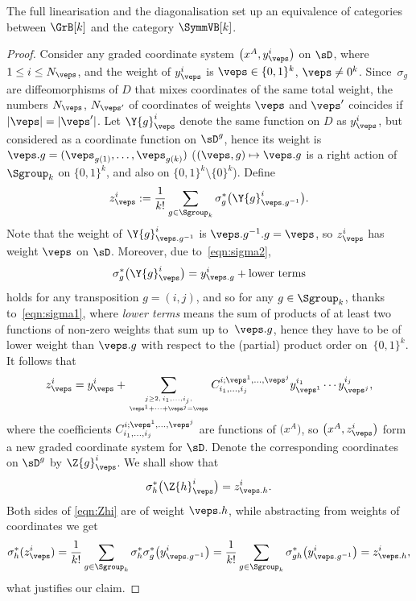 \begin{Theorem} \label{thm:equivalence_k}
The full linearisation and the diagonalisation set up an equivalence of categories between $\GrB[k]$ and the category $\SymmVB[k]$.
\end{Theorem}
\begin{proof} Consider any graded coordinate system $\big(x^A, y^i_\veps\big)$ on $\sD$, where $1\leq i\leq N_\veps$, and the weight of $y^i_\veps$ is $\veps\in\{0,1\}^k$, $\veps\neq 0^k$. Since~$\sigma_g$ are dif\/feomorphisms of $D$ that mixes coordinates of the same total weight, the numbers $N_\veps$, $N_{\veps'}$ of coordinates of weights $\veps$ and $\veps'$ coincides if $|\veps|=|\veps'|$. Let $\Y{g}^i_\veps$ denote the same function on $D$ as $y^i_\veps$, but considered as a coordinate function on $\sD^g$, hence its weight is $\veps.g =(\veps_{g(1)}, \ldots, \veps_{g(k)})$ ($(\veps, g)\mapsto \veps.g$ is a right action of $\Sgroup_k$ on $\{0, 1\}^k$, and also on $\{0, 1\}^k \setminus \{0\}^k$). Def\/ine
\begin{gather*}%
z^i_\veps := \frac{1}{k!}\sum_{g\in \Sgroup_k} \sigma^*_g \big(\Y{g}^i_{\veps.g^{-1}}\big).
\end{gather*}
Note that the weight of $\Y{g}^i_{\veps.g^{-1}}$ is $\veps.g^{-1}.g = \veps$, so $z^i_\veps$ has weight $\veps$ on $\sD$. Moreover, due to~\eqref{eqn:sigma2},
\begin{gather*}
\sigma_g^* \big(\Y{g}^i_\veps\big) = y^i_{\veps.g} + \text{lower terms}
\end{gather*}
holds for any transposition $g=(i, j)$, and so for any $g\in \Sgroup_k$, thanks to~\eqref{eqn:sigma1}, where \emph{lower terms} means the sum of products of at least two functions of non-zero weights that sum up to~$\veps.g$, hence they have to be of lower weight than $\veps.g$ with respect to the (partial) product order on~$\{0,1\}^k$.  It follows that
\begin{gather*}
z^i_\veps = y^i_\veps + \sum_{{j\geq 2, \,i_1, \ldots, i_j,}\atop {\veps^1+\cdots +\veps^j = \veps}} C^{i;\veps^1,\ldots,\veps^j}_{i_1, \ldots, i_j} y^{i_1}_{\veps^1} \cdots y^{i_j}_{\veps^j},
\end{gather*}
where the coef\/f\/icients $C^{i;\veps^1,\ldots,\veps^j}_{i_1, \ldots, i_j}$ are functions of $\big(x^A\big)$, so $\big(x^A, z^i_\veps\big)$ form a new graded coordinate system for $\sD$. Denote the corresponding coordinates on $\sD^g$ by $\Z{g}^i_\veps$. We shall show that
\begin{gather}\label{eqn:Zhi}
\sigma_h^* \big(\Z{h}^i_\veps\big) = z^i_{\veps.h}.
\end{gather}
Both sides of \eqref{eqn:Zhi} are of weight $\veps.h$, while abstracting from weights of coordinates we get
\begin{gather*}
\sigma_h^* (z^i_\veps) = \frac{1}{k!} \sum_{g\in \Sgroup_k} \sigma_h^* \sigma_g^* \big(y^i_{\veps.g^{-1}}\big) = \frac{1}{k!} \sum_{g\in \Sgroup_k} \sigma_{gh}^* \big(y^i_{\veps.g^{-1}}\big) = z^i_{\veps.h},
\end{gather*}
what justif\/ies our claim.


\end{proof}
